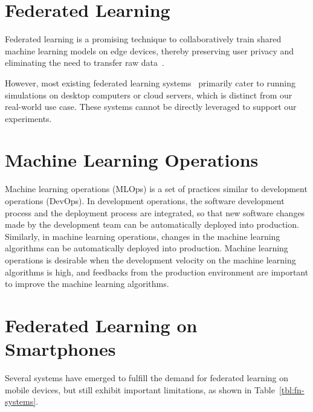 \section{Federated Learning}

Federated learning is a promising technique to collaboratively train
shared machine learning models on edge devices,
thereby preserving user privacy and eliminating the need to
transfer raw data~\cite{mcmahan2017communication}.

However, most existing federated learning systems~\cite[e.g.,][]{
    bonawitz2019towards,ma2019paddlepaddle,liu2021fate,openfl_citation,
} primarily cater to running simulations on desktop computers or cloud servers,
which is distinct from our real-world use case.
These systems cannot be directly leveraged to support our experiments.

\section{Machine Learning Operations}

Machine learning operations (MLOps) is a set of practices similar to
development operations (DevOps).
In development operations,
the software development process and the deployment process are integrated,
so that new software changes made by the development team can be
automatically deployed into production.
Similarly, in machine learning operations,
changes in the machine learning algorithms can be automatically deployed into
production.
Machine learning operations is desirable when the development velocity on
the machine learning algorithms is high,
and feedbacks from the production environment are important to improve
the machine learning algorithms.

\section{Federated Learning on Smartphones}

Several systems have emerged to fulfill the demand for federated learning on
mobile devices, but still exhibit important limitations,
as shown in Table~\ref{tbl:fn-systems}.

